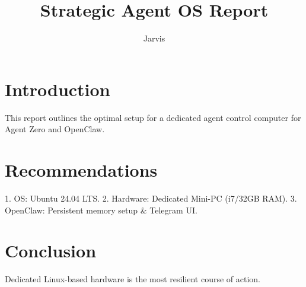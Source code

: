 \documentclass{article}
\begin{document}
\title{Strategic Agent OS Report}
\author{Jarvis}
\maketitle

\section{Introduction}
This report outlines the optimal setup for a dedicated agent control computer for Agent Zero and OpenClaw.

\section{Recommendations}
1. OS: Ubuntu 24.04 LTS.
2. Hardware: Dedicated Mini-PC (i7/32GB RAM).
3. OpenClaw: Persistent memory setup & Telegram UI.

\section{Conclusion}
Dedicated Linux-based hardware is the most resilient course of action.
\end{document}
